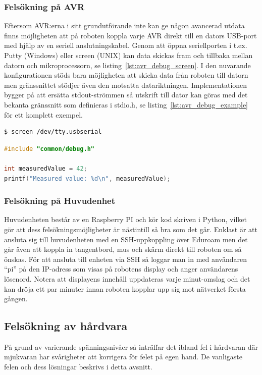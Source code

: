 \documentclass{article}
\begin{document}
\subsubsection{Felsökning på AVR}
Eftersom AVR:erna i sitt grundutförande inte kan ge någon avancerad utdata finns möjligheten att på roboten koppla varje AVR direkt till en dators USB-port med hjälp av en seriell anslutningskabel. Genom att öppna seriellporten i t.ex. Putty (Windows) eller screen (UNIX) kan data skickas fram och tillbaka mellan datorn och mikroprocessorn, se listing~\ref{lst:avr_debug_screen}. I den nuvarande konfigurationen stöds bara möjligheten att skicka data från roboten till datorn men gränssnittet stödjer även den motsatta datariktningen. Implementationen bygger på att ersätta stdout-strömmen så utskrift till dator kan göras med det bekanta gränssnitt som definieras i stdio.h, se listing~\ref{lst:avr_debug_example} för ett komplett exempel.
\newline
\begin{lstlisting}[language=sh, label={lst:avr_debug_screen}, caption={Anslutning via screen}]
$ screen /dev/tty.usbserial
\end{lstlisting}

\begin{lstlisting}[language=C, label={lst:avr_debug_example}, caption=Exempel av utskrift]
#include "common/debug.h"

int measuredValue = 42;
printf("Measured value: %d\n", measuredValue);
\end{lstlisting}

\subsubsection{Felsökning på Huvudenhet}
Huvudenheten består av en Raspberry PI och kör kod skriven i Python, vilket gör att dess felsökningsmöjligheter är nästintill så bra som det går. Enklast är att ansluta sig till huvudenheten med en SSH-uppkoppling över Eduroam men det går även att koppla in tangentbord, mus och skärm direkt till roboten om så önskas. För att ansluta till enheten via SSH så loggar man in med användaren ``pi'' på den IP-adress som visas på robotens display och anger användarens lösenord. Notera att displayens innehåll uppdateras varje minut-omslag och det kan dröja ett par minuter innan roboten kopplar upp sig mot nätverket första gången.

\subsection{Felsökning av hårdvara}
På grund av varierande spänningsnivåer så inträffar det ibland fel i hårdvaran där mjukvaran har svårigheter att korrigera för felet på egen hand. De vanligaste felen och dess lösningar beskrivs i detta avsnitt.
\end{document}
